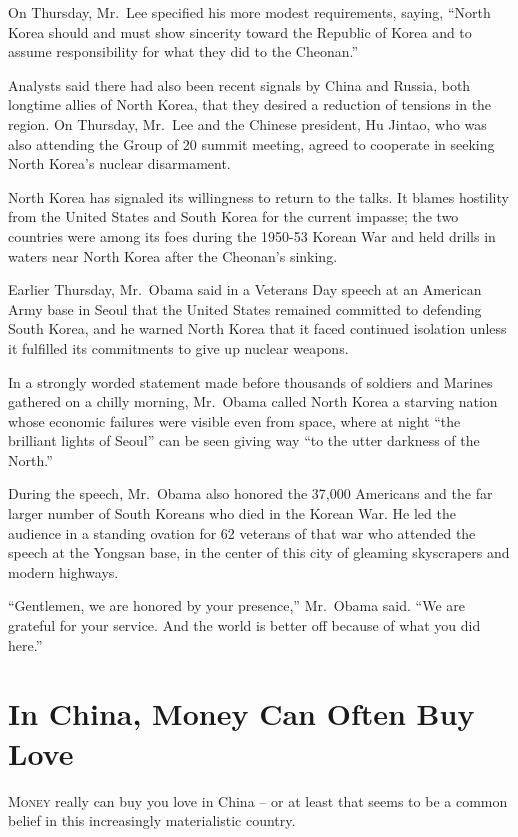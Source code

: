 ﻿\documentclass[12pt]{article}
\begin{document}
On Thursday, Mr.~Lee specified his more modest requirements, saying, ``North Korea should and must
show sincerity toward the Republic of Korea and to assume responsibility for what they did to the
Cheonan.''

Analysts said there had also been recent signals by China and Russia, both longtime allies of North
Korea, that they desired a reduction of tensions in the region. On Thursday, Mr.~Lee and the Chinese
president, Hu Jintao, who was also attending the Group of 20 summit meeting, agreed to cooperate in
seeking North Korea's nuclear disarmament.

North Korea has signaled its willingness to return to the talks. It blames hostility from the United
States and South Korea for the current impasse; the two countries were among its foes during the
1950-53 Korean War and held drills in waters near North Korea after the Cheonan's sinking.

Earlier Thursday, Mr.~Obama said in a Veterans Day speech at an American Army base in Seoul that the
United States remained committed to defending South Korea, and he warned North Korea that it faced
continued isolation unless it fulfilled its commitments to give up nuclear weapons.

In a strongly worded statement made before thousands of soldiers and Marines gathered on a chilly
morning, Mr.~Obama called North Korea a starving nation whose economic failures were visible even
from space, where at night ``the brilliant lights of Seoul'' can be seen giving way ``to the utter
darkness of the North.''

During the speech, Mr.~Obama also honored the 37,000 Americans and the far larger number of South
Koreans who died in the Korean War. He led the audience in a standing ovation for 62 veterans of
that war who attended the speech at the Yongsan base, in the center of this city of gleaming
skyscrapers and modern highways.

``Gentlemen, we are honored by your presence,'' Mr.~Obama said. ``We are grateful for your service.
And the world is better off because of what you did here.''

\section{In China, Money Can Often Buy Love}

\lettrine{M}{oney} really can buy you love in China -- or at least that
seems to be a common belief in this increasingly materialistic country.
\end{document}
